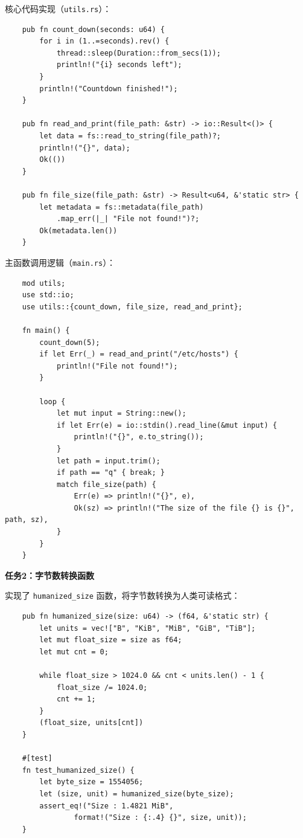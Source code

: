 \documentclass{SYSUReport}
\begin{document}
\begin{enumerate}[label={\chinese*、},labelsep=0pt]
    核心代码实现（\texttt{utils.rs}）：
    \begin{verbatim}
    pub fn count_down(seconds: u64) {
        for i in (1..=seconds).rev() {
            thread::sleep(Duration::from_secs(1));
            println!("{i} seconds left");
        }
        println!("Countdown finished!");
    }

    pub fn read_and_print(file_path: &str) -> io::Result<()> {
        let data = fs::read_to_string(file_path)?;
        println!("{}", data);
        Ok(())
    }

    pub fn file_size(file_path: &str) -> Result<u64, &'static str> {
        let metadata = fs::metadata(file_path)
            .map_err(|_| "File not found!")?;
        Ok(metadata.len())
    }
    \end{verbatim}
    
    主函数调用逻辑（\texttt{main.rs}）：
    \begin{verbatim}
    mod utils;
    use std::io;
    use utils::{count_down, file_size, read_and_print};

    fn main() {
        count_down(5);
        if let Err(_) = read_and_print("/etc/hosts") {
            println!("File not found!");
        }

        loop {
            let mut input = String::new();
            if let Err(e) = io::stdin().read_line(&mut input) {
                println!("{}", e.to_string());
            }
            let path = input.trim();
            if path == "q" { break; }
            match file_size(path) {
                Err(e) => println!("{}", e),
                Ok(sz) => println!("The size of the file {} is {}", path, sz),
            }
        }
    }
    \end{verbatim}
    
    \textbf{任务2：字节数转换函数}
    
    实现了 \texttt{humanized\_size} 函数，将字节数转换为人类可读格式：
    \begin{verbatim}
    pub fn humanized_size(size: u64) -> (f64, &'static str) {
        let units = vec!["B", "KiB", "MiB", "GiB", "TiB"];
        let mut float_size = size as f64;
        let mut cnt = 0;
        
        while float_size > 1024.0 && cnt < units.len() - 1 {
            float_size /= 1024.0;
            cnt += 1;
        }
        (float_size, units[cnt])
    }

    #[test]
    fn test_humanized_size() {
        let byte_size = 1554056;
        let (size, unit) = humanized_size(byte_size);
        assert_eq!("Size : 1.4821 MiB", 
                format!("Size : {:.4} {}", size, unit));
    }
    \end{verbatim}
    

\end{enumerate}
\end{document}
